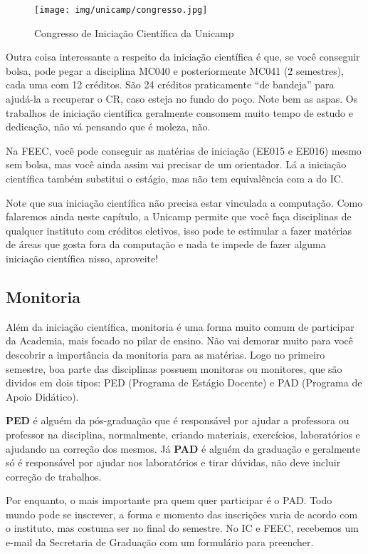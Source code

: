 \begin{figure}[h!]
  \centering
  \texttt{[image: img/unicamp/congresso.jpg]}
  \caption*{Congresso de Iniciação Científica da Unicamp}
\end{figure}

Outra coisa interessante a respeito da iniciação científica é que, se você
conseguir bolsa, pode pegar a disciplina MC040 e posteriormente MC041 (2
semestres), cada uma com 12 créditos. São 24 créditos praticamente ``de
bandeja'' para ajudá-la a recuperar o CR, caso esteja no fundo do poço. Note
bem as aspas. Os trabalhos de iniciação científica geralmente consomem muito
tempo de estudo e dedicação, não vá pensando que é moleza, não.

Na FEEC, você pode conseguir as matérias de iniciação (EE015 e EE016) mesmo
sem bolsa, mas você ainda assim vai precisar de um orientador. Lá a iniciação
científica também substitui o estágio, mas não tem equivalência com a do IC.

Note que sua iniciação científica não precisa estar vinculada a computação.
Como falaremos ainda neste capítulo, a Unicamp permite que você faça
disciplinas de qualquer instituto com créditos eletivos, isso pode te estimular
a fazer matérias de áreas que gosta fora da computação e nada te impede de
fazer alguma iniciação científica nisso, aproveite!

\subsection{Monitoria}

Além da iniciação científica, monitoria é uma forma muito comum de participar
da Academia, mais focado no pilar de ensino. Não vai demorar muito para você
descobrir a importância da monitoria para as matérias. Logo no primeiro
semestre, boa parte das disciplinas possuem monitoras ou monitores, que são
dividos em dois tipos: PED (Programa de Estágio Docente) e PAD (Programa de
Apoio Didático).

\textbf{PED} é alguém da pós-graduação que é responsável por ajudar a
professora ou professor na disciplina, normalmente, criando materiais,
exercícios, laboratórios e ajudando na correção dos mesmos. Já \textbf{PAD} é
alguém da graduação e geralmente só é responsável por ajudar nos laboratórios e
tirar dúvidas, não deve incluir correção de trabalhos.

Por enquanto, o mais importante pra quem quer participar é o PAD. Todo mundo
pode se inscrever, a forma e momento das inscrições varia de acordo com o
instituto, mas costuma ser no final do semestre. No IC e FEEC, recebemos um
e-mail da Secretaria de Graduação com um formulário para preencher.

